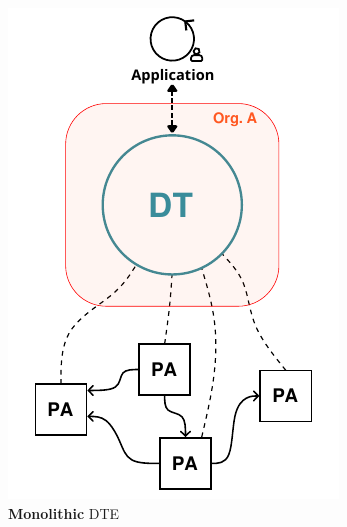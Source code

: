 \begin{figure}[ht]
    \centering
    \begin{subfigure}[b]{0.3\linewidth}
        \centering
        \includegraphics[width=\linewidth]{figures/hwodt/ecosystems_types-monolithic.pdf}
        \caption{\textbf{Monolithic} \ac{DTE}}
        \label{fig:ecosystem-monolithic}
    \end{subfigure}
    \hfill
    \begin{subfigure}[b]{0.3\linewidth}
        \centering

\end{subfigure}
\end{figure}
